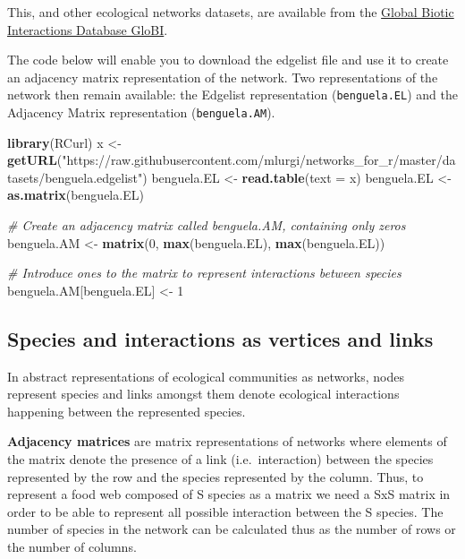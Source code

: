 \documentclass[
]{article}
\newenvironment{Shaded}{\begin{snugshade}}{\end{snugshade}}
\newcommand{\AttributeTok}[1]{\textcolor[rgb]{0.13,0.29,0.53}{#1}}
\newcommand{\CommentTok}[1]{\textcolor[rgb]{0.56,0.35,0.01}{\textit{#1}}}
\newcommand{\DecValTok}[1]{\textcolor[rgb]{0.00,0.00,0.81}{#1}}
\newcommand{\FunctionTok}[1]{\textcolor[rgb]{0.13,0.29,0.53}{\textbf{#1}}}
\newcommand{\NormalTok}[1]{#1}
\newcommand{\OtherTok}[1]{\textcolor[rgb]{0.56,0.35,0.01}{#1}}
\newcommand{\StringTok}[1]{\textcolor[rgb]{0.31,0.60,0.02}{#1}}
\begin{document}
This, and other ecological networks datasets, are available from the
\href{https://www.globalbioticinteractions.org/}{Global Biotic
Interactions Database GloBI}.

The code below will enable you to download the edgelist file and use it
to create an adjacency matrix representation of the network. Two
representations of the network then remain available: the Edgelist
representation (\texttt{benguela.EL}) and the Adjacency Matrix
representation (\texttt{benguela.AM}).

\begin{Shaded}
\begin{Highlighting}[]
\FunctionTok{library}\NormalTok{(RCurl)}
\NormalTok{x }\OtherTok{\textless{}{-}} \FunctionTok{getURL}\NormalTok{(}\StringTok{"https://raw.githubusercontent.com/mlurgi/networks\_for\_r/master/datasets/benguela.edgelist"}\NormalTok{)}
\NormalTok{benguela.EL }\OtherTok{\textless{}{-}} \FunctionTok{read.table}\NormalTok{(}\AttributeTok{text =}\NormalTok{ x) }
\NormalTok{benguela.EL }\OtherTok{\textless{}{-}} \FunctionTok{as.matrix}\NormalTok{(benguela.EL)}
\end{Highlighting}
\end{Shaded}

\begin{Shaded}
\begin{Highlighting}[]
\CommentTok{\# Create an adjacency matrix called benguela.AM, containing only zeros}
\NormalTok{benguela.AM }\OtherTok{\textless{}{-}} \FunctionTok{matrix}\NormalTok{(}\DecValTok{0}\NormalTok{, }\FunctionTok{max}\NormalTok{(benguela.EL), }\FunctionTok{max}\NormalTok{(benguela.EL))}

\CommentTok{\# Introduce ones to the matrix to represent interactions between species}
\NormalTok{benguela.AM[benguela.EL] }\OtherTok{\textless{}{-}} \DecValTok{1}
\end{Highlighting}
\end{Shaded}

\subsection{Species and interactions as vertices and
links}\label{species-and-interactions-as-vertices-and-links}

In abstract representations of ecological communities as networks, nodes
represent species and links amongst them denote ecological interactions
happening between the represented species.

\textbf{Adjacency matrices} are matrix representations of networks where
elements of the matrix denote the presence of a link (i.e.~interaction)
between the species represented by the row and the species represented
by the column. Thus, to represent a food web composed of S species as a
matrix we need a SxS matrix in order to be able to represent all
possible interaction between the S species. The number of species in the
network can be calculated thus as the number of rows or the number of
columns.
\end{document}
